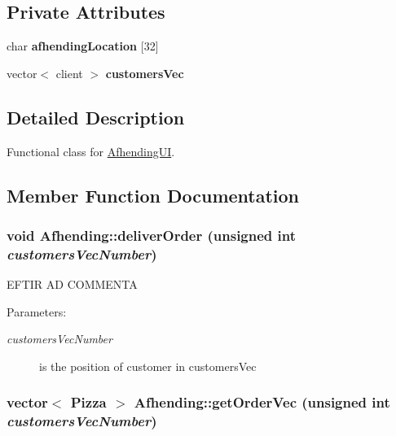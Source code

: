 \subsection*{Private Attributes}
\begin{CompactItemize}
\item 
\hypertarget{class_afhending_85acd631eb078696afb9935bedeeb107}{
char {\bf afhending\-Location} \mbox{[}32\mbox{]}}
\label{class_afhending_85acd631eb078696afb9935bedeeb107}

\item 
\hypertarget{class_afhending_52cc86469dd41b9be5b7186d6bd00589}{
vector$<$ client $>$ {\bf customers\-Vec}}
\label{class_afhending_52cc86469dd41b9be5b7186d6bd00589}

\end{CompactItemize}


\subsection{Detailed Description}
Functional class for \hyperlink{class_afhending_u_i}{Afhending\-UI}. 



\subsection{Member Function Documentation}
\hypertarget{class_afhending_1d223b1559fc42935dfef28841735951}{
\subsubsection[deliverOrder]{\setlength{\rightskip}{0pt plus 5cm}void Afhending::deliver\-Order (unsigned int {\em customers\-Vec\-Number})}}
\label{class_afhending_1d223b1559fc42935dfef28841735951}


EFTIR AD  COMMENTA

\begin{Desc}
\item[Parameters:]
\begin{description}
\item[{\em customers\-Vec\-Number}]is the position of customer in customers\-Vec \end{description}
\end{Desc}
\hypertarget{class_afhending_ad0cbeddec394b25c5eade57247f4110}{
\subsubsection[getOrderVec]{\setlength{\rightskip}{0pt plus 5cm}vector$<$ Pizza $>$ Afhending::get\-Order\-Vec (unsigned int {\em customers\-Vec\-Number})}}
\label{class_afhending_ad0cbeddec394b25c5eade57247f4110}


